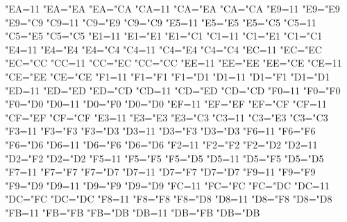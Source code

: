 {    \catcode"EA=11 \lccode"EA="EA \uccode"EA="CA %
    \catcode"CA=11 \lccode"CA="EA \uccode"CA="CA %
    \catcode"E9=11 \lccode"E9="E9 \uccode"E9="C9 %
    \catcode"C9=11 \lccode"C9="E9 \uccode"C9="C9 %
    \catcode"E5=11 \lccode"E5="E5 \uccode"E5="C5 %
    \catcode"C5=11 \lccode"C5="E5 \uccode"C5="C5 %
    \catcode"E1=11 \lccode"E1="E1 \uccode"E1="C1 %
    \catcode"C1=11 \lccode"C1="E1 \uccode"C1="C1 %
    \catcode"E4=11 \lccode"E4="E4 \uccode"E4="C4 %
    \catcode"C4=11 \lccode"C4="E4 \uccode"C4="C4 %
    \catcode"EC=11 \lccode"EC="EC \uccode"EC="CC %
    \catcode"CC=11 \lccode"CC="EC \uccode"CC="CC %
    \catcode"EE=11 \lccode"EE="EE \uccode"EE="CE %
    \catcode"CE=11 \lccode"CE="EE \uccode"CE="CE %
    \catcode"F1=11 \lccode"F1="F1 \uccode"F1="D1 %
    \catcode"D1=11 \lccode"D1="F1 \uccode"D1="D1 %
    \catcode"ED=11 \lccode"ED="ED \uccode"ED="CD %
    \catcode"CD=11 \lccode"CD="ED \uccode"CD="CD %
    \catcode"F0=11 \lccode"F0="F0 \uccode"F0="D0 %
    \catcode"D0=11 \lccode"D0="F0 \uccode"D0="D0 %
    \catcode"EF=11 \lccode"EF="EF \uccode"EF="CF %
    \catcode"CF=11 \lccode"CF="EF \uccode"CF="CF %
    \catcode"E3=11 \lccode"E3="E3 \uccode"E3="C3 %
    \catcode"C3=11 \lccode"C3="E3 \uccode"C3="C3 %
    \catcode"F3=11 \lccode"F3="F3 \uccode"F3="D3 %
    \catcode"D3=11 \lccode"D3="F3 \uccode"D3="D3 %
    \catcode"F6=11 \lccode"F6="F6 \uccode"F6="D6 %
    \catcode"D6=11 \lccode"D6="F6 \uccode"D6="D6 %
    \catcode"F2=11 \lccode"F2="F2 \uccode"F2="D2 %
    \catcode"D2=11 \lccode"D2="F2 \uccode"D2="D2 %
    \catcode"F5=11 \lccode"F5="F5 \uccode"F5="D5 %
    \catcode"D5=11 \lccode"D5="F5 \uccode"D5="D5 %
    \catcode"F7=11 \lccode"F7="F7 \uccode"F7="D7 %
    \catcode"D7=11 \lccode"D7="F7 \uccode"D7="D7 %
    \catcode"F9=11 \lccode"F9="F9 \uccode"F9="D9 %
    \catcode"D9=11 \lccode"D9="F9 \uccode"D9="D9 %
    \catcode"FC=11 \lccode"FC="FC \uccode"FC="DC %
    \catcode"DC=11 \lccode"DC="FC \uccode"DC="DC %
    \catcode"F8=11 \lccode"F8="F8 \uccode"F8="D8 %
    \catcode"D8=11 \lccode"D8="F8 \uccode"D8="D8 %
    \catcode"FB=11 \lccode"FB="FB \uccode"FB="DB %
    \catcode"DB=11 \lccode"DB="FB \uccode"DB="DB %
}
